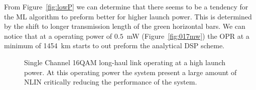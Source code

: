 From Figure~\ref{fig:lowP} we can determine that there seems to be a tendency for the ML algorithm to preform better for higher launch power. This is determined by the shift to longer transmission length of the green horizontal bars. We can notice that at a operating power of $0.5$~mW (Figure~\ref{fig:017mw}) the OPR at a minimum of 1454~km  starts to out preform the analytical DSP scheme. 
\begin{figure}[h]
  \centering
\qquad
{}       
  \caption{Single Channel 16QAM long-haul link operating at a high launch power. At this operating power the system present a large amount of NLIN critically reducing the performance of the system. }                                                                                                                                                                                                                                                                                                                                                                                                                                                                                                                                                                                                                                                                                                                                                                                                                                                                                                                                                                                                                                                                                                                                                                                                                                                                                                                                                                                                                                                                                                                                                                                                                                                                                                                                                                                                                                                                                                                                                                                                                                                                                                                                                                                                                                                                                                                                                                                                                                                                                                                                            
\end{figure}
